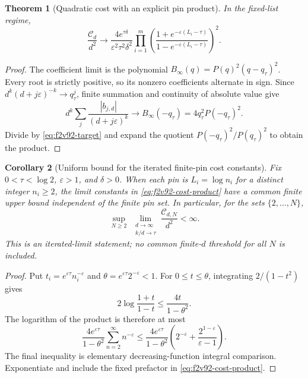 \documentclass[11pt]{article}
\newtheorem{theorem}{Theorem}[section]
\newtheorem{corollary}[theorem]{Corollary}
\theoremstyle{definition}
\theoremstyle{remark}
\begin{document}
\begin{theorem}[Quadratic cost with an explicit pin product]
\label{thm:f2v92-cost}
In the fixed-list regime,
\begin{equation}
 \frac{\mathcal C_d}{d^2}\longrightarrow
 \frac{4e^{\tau\delta}}{\varepsilon^2\tau^2\delta^2}
 \prod_{i=1}^m
 \left(\frac{1+e^{-\varepsilon(L_i-\tau)}}
            {1-e^{-\varepsilon(L_i-\tau)}}\right)^2.
 \label{eq:f2v92-cost-product}
\end{equation}
\end{theorem}

\begin{proof}
The coefficient limit is the polynomial
\(B_\infty(q)=P(q)^2(q-q_\tau)^2\).  Every root is strictly
positive, so its nonzero coefficients alternate in sign.  Since
\(d^k(d+j\varepsilon)^{-k}\to q_\tau^j\), finite summation
and continuity of absolute value give
\[
 d^k\sum_j\frac{|b_{j,d}|}{(d+j\varepsilon)^k}
 \longrightarrow B_\infty(-q_\tau)
 =4q_\tau^2P(-q_\tau)^2.
\]
Divide by \eqref{eq:f2v92-target} and expand the quotient
\(P(-q_\tau)^2/P(q_\tau)^2\) to obtain the product.
\end{proof}

\begin{corollary}[Uniform bound for the iterated finite-pin cost constants]
\label{cor:f2v92-iterated}
Fix \(0<\tau<\log2\), \(\varepsilon>1\), and \(\delta>0\).
When each pin is \(L_i=\log n_i\) for a distinct integer \(n_i\ge2\),
the limit constants in \eqref{eq:f2v92-cost-product} have a common
finite upper bound independent of the finite pin set.  In particular,
for the sets \(\{2,\ldots,N\}\),
\begin{equation}
 \sup_{N\ge2}\ \lim_{\substack{d\to\infty\\ k/d\to\tau}}
                   \frac{\mathcal C_{d,N}}{d^2}<\infty.
 \label{eq:f2v92-iterated}
\end{equation}
This is an iterated-limit statement; no common finite-\(d\) threshold
for all \(N\) is included.
\end{corollary}

\begin{proof}
Put \(t_i=e^{\varepsilon\tau}n_i^{-\varepsilon}\) and
\(\theta=e^{\varepsilon\tau}2^{-\varepsilon}<1\).  For
\(0\le t\le\theta\), integrating \(2/(1-t^2)\) gives
\[
 2\log\frac{1+t}{1-t}\le\frac{4t}{1-\theta^2}.
\]
The logarithm of the product is therefore at most
\[
 \frac{4e^{\varepsilon\tau}}{1-\theta^2}
 \sum_{n=2}^{\infty}n^{-\varepsilon}
 \le\frac{4e^{\varepsilon\tau}}{1-\theta^2}
       \left(2^{-\varepsilon}
                  +\frac{2^{1-\varepsilon}}{\varepsilon-1}\right).
\]
The final inequality is elementary decreasing-function integral
comparison.  Exponentiate and include the fixed prefactor in
\eqref{eq:f2v92-cost-product}.
\end{proof}
\end{document}
